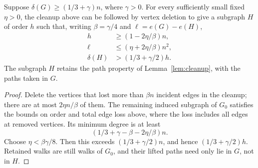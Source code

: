 \begin{lemma}\label{lem:prune}
Suppose $\delta(G)\ge(1/3+\gamma)n$, where $\gamma>0$. For every sufficiently small fixed $\eta>0$, the cleanup above can be followed by vertex deletion to give a subgraph $H$ of order $h$ such that, writing $\beta=\gamma/4$ and $\ell=e(G)-e(H)$,
\begin{align}
 h&\ge(1-2\eta/\beta)n,\label{eq:pruneorder}\\
 \ell&\le(\eta+2\eta/\beta)n^2,\label{eq:pruneloss}\\
 \delta(H)&>(1/3+\gamma/2)h.\label{eq:prunedegree}
\end{align}
The subgraph $H$ retains the path property of Lemma~\ref{lem:cleanup}, with the paths taken in $G$.
\end{lemma}
\begin{proof}
Delete the vertices that lost more than $\beta n$ incident edges in the cleanup; there are at most $2\eta n/\beta$ of them. The remaining induced subgraph of $G_0$ satisfies the bounds on order and total edge loss above, where the loss includes all edges at removed vertices. Its minimum degree is at least
\[
 (1/3+\gamma-\beta-2\eta/\beta)n.
\]
Choose $\eta<\beta\gamma/8$. Then this exceeds $(1/3+\gamma/2)n$, and hence $(1/3+\gamma/2)h$. Retained walks are still walks of $G_0$, and their lifted paths need only lie in $G$, not in $H$.
\end{proof}
